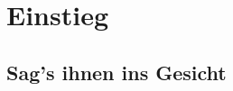 \section{Einstieg} %
\label{sec:einstieg}

\subsection{Sag's ihnen ins Gesicht} %
\label{sub:sag_s_ihnen_ins_gesicht}




